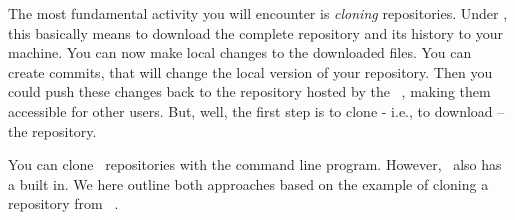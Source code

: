 %
\label{sec:gitClone}%
%
The most fundamental activity you will encounter is \emph{cloning} repositories.
Under \git, this basically means to download the complete repository and its history to your machine.
You can now make local changes to the downloaded files.
You can create commits, that will change the local version of your repository.
Then you could push these changes back to the repository hosted by the \git\ , making them accessible for other users.
But, well, the first step is to clone - i.e., to download -- the repository.

You can clone \git\ repositories with the command line   program.
However, \pycharm\ also has a \git {} built in.
We here outline both approaches based on the example of cloning a repository from \github~\cite{GH2025RDCAR}.%
%
%
%
%
\endhsection%
